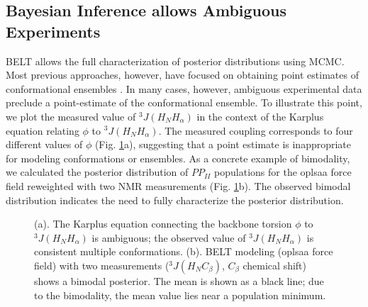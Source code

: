 \documentclass[11pt,titlepage]{article}
\begin{document}
\subsection*{Bayesian Inference allows Ambiguous Experiments}

BELT allows the full characterization of posterior distributions using MCMC.  Most previous approaches, however, have focused on obtaining point estimates of conformational ensembles  \citep{rozycki2011saxs,  Graf2007}.  In many cases, however, ambiguous experimental data preclude a point-estimate of the conformational ensemble.  To illustrate this point, we plot the measured  \citep{Graf2007} value of $^3J(H_NH_\alpha)$ in the context of the Karplus \citep{vogeli2007limits} equation relating $\phi$ to $^3J(H_NH_\alpha)$.  The measured coupling corresponds to four different values of $\phi$ (Fig. \ref{figure:Ambiguity}a), suggesting that a point estimate is inappropriate for modeling conformations or ensembles.  As a concrete example of bimodality, we calculated the posterior distribution of $PP_{II}$ populations for the oplsaa force field reweighted with two NMR measurements (Fig. \ref{figure:Ambiguity}b).  The observed bimodal distribution indicates the need to fully characterize the posterior 
distribution.  

\begin{figure}
\caption{
(a).  The Karplus equation connecting the backbone torsion $\phi$ to $^3J(H_NH_\alpha)$ is ambiguous; the observed value of $^3J(H_NH_\alpha)$ is consistent multiple conformations.  (b).  BELT modeling (oplsaa force field) with two measurements ($^3J(H_N C_\beta)$, $C_\beta$ chemical shift) shows a bimodal posterior.  The mean is shown as a black line; due to the bimodality, the mean value lies near a population minimum.
}
\label{figure:Ambiguity}

\end{figure}
\end{document}

